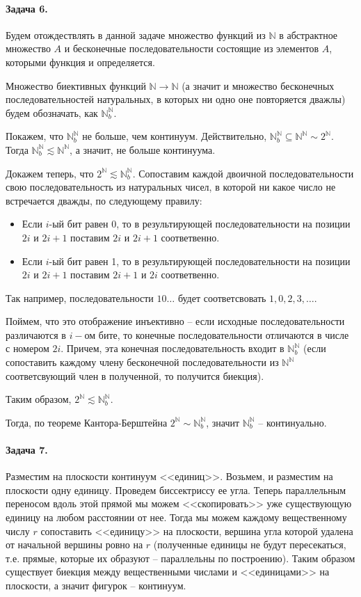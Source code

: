 \documentclass{article}
\newcommand{\andi}{$ и $}
\newcommand{\N}{\mathbb{N}}
\begin{document}
    \paragraph{Задача 6.}
    Будем отождествлять в данной задаче множество функций из $\N$ в абстрактное множество $A$ и бесконечные последовательности состоящие из элементов $A$, которыми функция и определяется.

    Множество биективных функций $\N \rightarrow \N$ (а значит и множество бесконечных последовательностей натуральных, в которых ни одно оне повторяется дважлы) будем обозначать, как $\N_b^{\N}$.

    Покажем, что $\N_b^{\N}$ не больше, чем континуум. Действительно, $\N_b^{\N} \subseteq \N^{\N} \sim 2^{\N}$. Тогда $\N_b^{\N} \apprle \N^{\N}$, а значит, не больше континуума.

    Докажем теперь, что $2^{\N} \apprle \N_b^{\N}$. Сопоставим каждой двоичной последовательности свою последовательность из натуральных чисел, в которой ни какое число не встречается дважды, по следующему правилу:

    \begin{itemize}
        \item Если $i$-ый бит равен 0, то в результирующей последовательности на позиции $2i \andi 2i + 1$ поставим $2i \andi 2i + 1$ соответвенно.

        \item Если $i$-ый бит равен 1, то в результирующей последовательности на позиции $2i \andi 2i + 1$ поставим $2i + 1 \andi 2i$ соответвенно.
    \end{itemize}

    Так например, последовательности $10\ldots$ будет соответсвовать $1, 0, 2, 3, \ldots$.

    Поймем, что это отображение инъективно -- если исходные последовательности различаются в $i-$ом бите, то конечные последовательности отличаются в числе с номером $2i$. Причем, эта конечная последовательность входит в $\N_b^{\N}$ (если сопоставить каждому члену бесконечной последовательности из $\N^{\N}$ соответсвующий член в полученной, то получится биекция).

    Таким образом, $2^{\N} \apprle \N_b^{\N}$. 

    Тогда, по теореме Кантора-Берштейна $2^{\N} \sim \N_b^{\N}$, значит $\N_b^{\N}$ -- континуально.

    \paragraph{Задача 7.}
    Разместим на плоскости континуум <<единиц>>. Возьмем, и разместим на плоскости одну единицу. Проведем биссектриссу ее угла. Теперь параллельным переносом вдоль этой прямой мы можем <<скопировать>> уже существующую единицу на любом расстоянии от нее. Тогда мы можем каждому вещественному числу $r$ сопоставить <<единицу>> на плоскости, вершина угла которой удалена от начальной вершины ровно на $r$ (полученные единицы не будут пересекаться, т.е. прямые, которые их образуют -- параллельны по построению). Таким образом существует биекция между вещественными числами и <<единицами>> на плоскости, а значит фигурок -- континуум.
\end{document}

